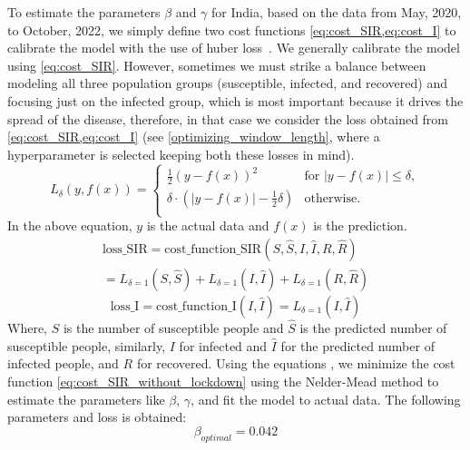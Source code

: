 \documentclass[tikz,fleqn,12pt]{wlscirep}
\begin{document}
To estimate the parameters $\beta$ and $\gamma$ for India, based on the data from May, 2020, to October, 2022, we simply define two cost functions \cref{eq:cost_SIR,eq:cost_I} to calibrate the model with the use of huber loss~\cite{huberloss}. We generally calibrate the model using \cref{eq:cost_SIR}. However, sometimes we must strike a balance between modeling all three population groups (susceptible, infected, and recovered) and focusing just on the infected group, which is most important because it drives the spread of the disease, therefore, in that case we consider the loss obtained from \cref{eq:cost_SIR,eq:cost_I} (see \cref{optimizing_window_length}, where a hyperparameter is selected keeping both these losses in mind).
\begin{equation}
  L_{\delta}(y, f(x)) = 
  \begin{cases}
    \frac{1}{2}{(y - f(x))^2} & \text{for } |y - f(x)| \leq \delta, \\
    \delta \cdot (|y - f(x)| - \frac{1}{2}\delta) & \text{otherwise.} \\
  \end{cases}
  \label{eq:huberloss}
\end{equation}
In the above equation, $y$ is the actual data and $f(x)$ is the prediction.
\begin{equation}
  \begin{split}
  \textrm{loss\_SIR} = \textrm{cost\_function\_SIR}(S, \hat{S}, I, \hat{I}, R, \hat{R}) \\
  = L_{\delta = 1}(S, \hat{S}) + L_{\delta = 1}(I, \hat{I}) + L_{\delta = 1}(R, \hat{R})
  \end{split}
  \label{eq:cost_SIR}
\end{equation}
\begin{equation}
  \textrm{loss\_I} = \textrm{cost\_function\_I}(I, \hat{I}) = L_{\delta = 1}(I, \hat{I})
  \label{eq:cost_I}
\end{equation}
Where, $S$ is the number of susceptible people and $\hat{S}$ is the predicted number of susceptible people, similarly, $I$ for infected and $\hat{I}$ for the predicted number of infected people, and $R$ for recovered. Using the equations , we minimize the cost function \cref{eq:cost_SIR_without_lockdown} using the Nelder-Mead method\cite{Gao2010} to estimate the parameters like $\beta$, $\gamma$, and fit the model to actual data. The following parameters and loss is obtained:
\begin{equation}
  \beta_{optimal} = 0.042
  \label{eq:beta_optimal_without_lockdown}
\end{equation}
\end{document}
